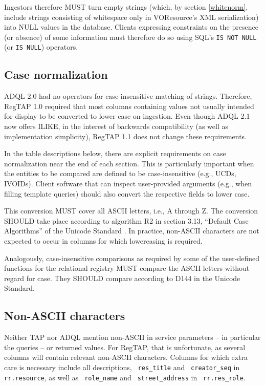 \documentclass[11pt,a4paper]{ivoa}
\newcommand{\rtent}[1]{\texttt{\color{rtcolor} #1}}
\begin{document}
Ingestors therefore MUST turn empty strings (which, by section \ref{whitenorm}, include strings consisting of whitespace
only in VOResource's XML serialization) into NULL values in the
database.  Clients expressing constraints on the presence (or absence)
of some information must therefore do so using SQL's \texttt{IS NOT NULL}
(or \texttt{IS NULL}) operators.


\subsection{Case normalization}

\label{casenorm}

ADQL 2.0 had no operators for case-insensitive matching of strings.
Therefore, RegTAP 1.0 required that most columns
containing values not usually intended for display to be
converted to lower case on ingestion.  Even though ADQL 2.1 now offers
ILIKE, in the interest of backwards compatibility (as well as
implementation simplicity), RegTAP 1.1 does not change these
requirements.

In the table descriptions below, there are
explicit requirements on case normalization near the end of each
section.  This is particularly important when the entities to be
compared are defined to be case-insensitive (e.g., UCDs, IVOIDs).
Client software that can inspect user-provided arguments (e.g., when
filling template queries) should also convert the respective fields to
lower case.

This conversion MUST cover all ASCII letters, i.e., A through Z.  
The conversion SHOULD take place according to
algorithm R2 in section 3.13, ``Default Case Algorithms'' of the Unicode
Standard
\citep{std:UNICODE}.  In practice, non-ASCII characters are not expected
to occur in columns for which lowercasing is required.

Analogously, case-insensitive comparisons as required by some of the
user-defined functions for the relational registry MUST compare
the ASCII letters without regard for case.  They SHOULD compare according
to D144 in the Unicode Standard.


\subsection{Non-ASCII characters}

\label{utfreq}

Neither TAP nor ADQL mention non-ASCII in service parameters -- in
particular the queries -- or returned values.  For RegTAP, that is
unfortunate, as several columns will contain relevant non-ASCII
characters.  Columns for which extra care is necessary include all
descriptions, \rtent{res\_title} and \rtent{creator\_seq} in
\rtent{rr.resource}, as well as \rtent{role\_name} and
\rtent{street\_address} in \rtent{rr.res\_role}.
\end{document}
